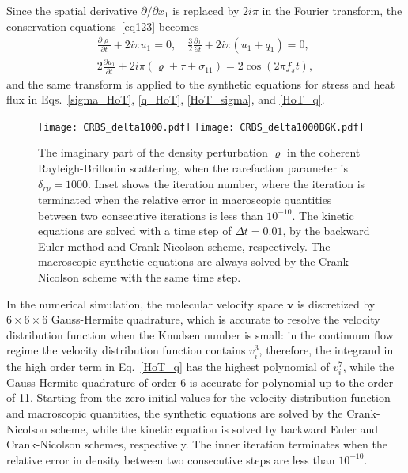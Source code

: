 \documentclass[onefignum,onetabnum]{siamart171218}
\begin{document}
Since the spatial derivative $\partial/\partial{x_1}$ is replaced by $2i\pi$ in the Fourier transform, the conservation equations~\eqref{eq123} becomes
\begin{eqnarray}
\frac{\partial{\varrho}}{\partial t}+2i\pi{{u}_1}=0, \quad
\frac{3}{2}\frac{\partial{\tau}}{\partial t}+2i\pi(u_1+q_1)=0, \\
2\frac{\partial{u}_1}{\partial t}+2i\pi(\varrho+\tau+\sigma_{11})=2\cos(2\pi{f_s}t),
\end{eqnarray}
and the same transform is applied to the synthetic equations for stress and heat flux in Eqs.~\eqref{sigma_HoT}, \eqref{q_HoT}, \eqref{HoT_sigma}, and \eqref{HoT_q}. 


\begin{figure}[t]
	\centering
	\texttt{[image: CRBS\_delta1000.pdf]}
	\texttt{[image: CRBS\_delta1000BGK.pdf]}
	\caption{
		The imaginary part of the density perturbation $\varrho$ in the coherent Rayleigh-Brillouin scattering, when the rarefaction parameter is $\delta_{rp}=1000$. Inset shows the iteration number, where the iteration is terminated when the relative error in macroscopic quantities between two consecutive iterations is less than $10^{-10}$. The kinetic equations are solved with a time step of $\Delta{t}=0.01$, by the backward Euler method and Crank-Nicolson scheme, respectively. The macroscopic synthetic equations are always solved by the Crank-Nicolson scheme with the same time step.
	}
	\label{fig:CRBS}
\end{figure}

In the numerical simulation, the molecular velocity space $\bm{v}$ is discretized by $6\times6\times6$ Gauss-Hermite quadrature, which is accurate to resolve the velocity distribution function when the Knudsen number is small: in the continuum flow regime the velocity distribution function contains $v^3_i$, therefore, the integrand in the high order term in Eq.~\eqref{HoT_q} has the highest polynomial of $v^7_i$, while the Gauss-Hermite quadrature of order 6 is accurate for polynomial up to the order of 11. Starting from the zero initial values for the velocity distribution function and macroscopic quantities, the synthetic equations are solved by the Crank-Nicolson scheme, while the kinetic equation is solved by backward Euler and Crank-Nicolson schemes, respectively. The inner iteration terminates when the relative error in density between two consecutive steps are less than $10^{-10}$. 
\end{document}
